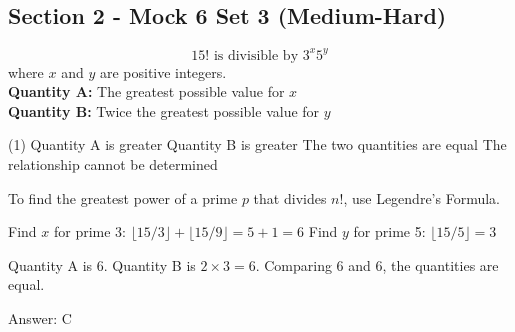 \documentclass[11pt,paper=a4,answers]{exam}
\begin{document}
\begin{questions}
\pointsinrightmargin
\pointsdroppedatright
\marksnotpoints
{}
\pointformat{\boldmath\themarginpoints}
\bracketedpoints


\section*{Section 2 - Mock 6 Set 3 (Medium-Hard)}


\question
\[ 15! \text{ is divisible by } 3^x 5^y \]
where $x$ and $y$ are positive integers.
\vspace{5pt}\\
\textbf{Quantity A: } The greatest possible value for $x$ \\
\vspace{5pt}
\textbf{Quantity B: } Twice the greatest possible value for $y$

\begin{tasks}(1)
\task[A)] Quantity A is greater
\task[B)] Quantity B is greater
\task[C)] The two quantities are equal
\task[D)] The relationship cannot be determined
\end{tasks}

\begin{solution}
To find the greatest power of a prime $p$ that divides $n!$, use Legendre's Formula.
\vspace{5pt}
\begin{center}
Find $x$ for prime 3: $\lfloor 15/3 \rfloor + \lfloor 15/9 \rfloor = 5 + 1 = 6$
\vspace{5pt}
Find $y$ for prime 5: $\lfloor 15/5 \rfloor = 3$
\end{center}
\vspace{5pt}
Quantity A is 6. 
\vspace{5pt}
Quantity B is $2 \times 3 = 6$.
\vspace{5pt}
Comparing 6 and 6, the quantities are equal.

Answer: \colorbox{yellow!100}{C}
\end{solution}

\vspace{1cm}


\end{questions}
\end{document}
